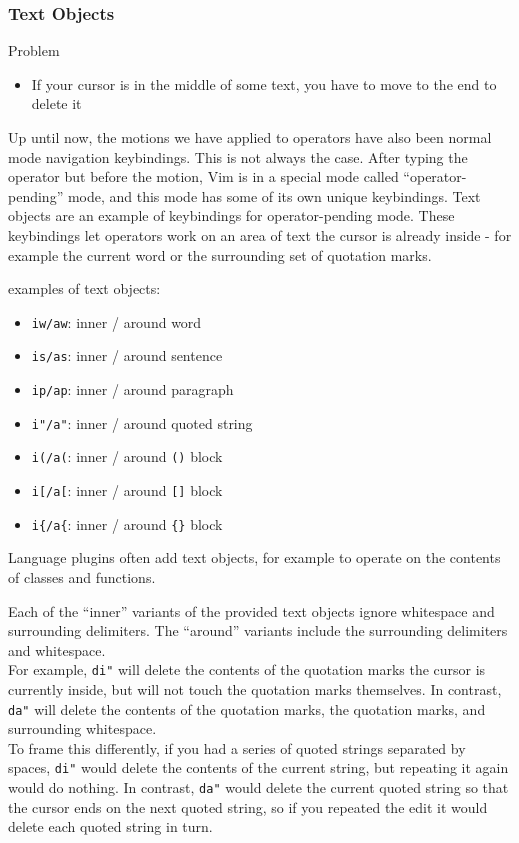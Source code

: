 \documentclass{beamer}
\begin{document}
\begin{frame}[fragile]
    \frametitle{Text Objects}
    \small
    \begin{block}{Problem}
	\begin{itemize}
	    \item If your cursor is in the middle of some text, you have to move to the end to delete it
	\end{itemize}
    \end{block}
    Up until now, the motions we have applied to operators have also been normal mode navigation keybindings. This is not always the case. After typing the operator but before the motion, Vim is in a special mode called \enquote{operator-pending} mode, and this mode has some of its own unique keybindings. Text objects are an example of keybindings for operator-pending mode. These keybindings let operators work on an area of text the cursor is already inside - for example the current word or the surrounding set of quotation marks.
\end{frame}

\begin{frame}[fragile]
    \small
    examples of text objects:
    \begin{itemize}
	\item \verb+iw/aw+: inner / around word
	\item \verb+is/as+: inner / around sentence
	\item \verb+ip/ap+: inner / around paragraph
	\item \verb+i"/a"+: inner / around quoted string
	\item \verb+i(/a(+: inner / around \verb+()+ block
	\item \verb+i[/a[+: inner / around \verb+[]+ block
	\item \verb+i{/a{+: inner / around \verb+{}+ block
    \end{itemize}
    Language plugins often add text objects, for example to operate on the contents of classes and functions.
\end{frame}

\begin{frame}[fragile]
    \small
    Each of the \enquote{inner} variants of the provided text objects ignore whitespace and surrounding delimiters. The \enquote{around} variants include the surrounding delimiters and whitespace. \\
    \vspace{0.5cm}
    For example, \verb+di"+ will delete the contents of the quotation marks the cursor is currently inside, but will not touch the quotation marks themselves. In contrast, \verb+da"+ will delete the contents of the quotation marks, the quotation marks, and surrounding whitespace. \\
    \vspace{0.5cm}
    To frame this differently, if you had a series of quoted strings separated by spaces, \verb+di"+ would delete the contents of the current string, but repeating it again would do nothing. In contrast, \verb+da"+ would delete the current quoted string so that the cursor ends on the next quoted string, so if you repeated the edit it would delete each quoted string in turn.
\end{frame}
\end{document}

